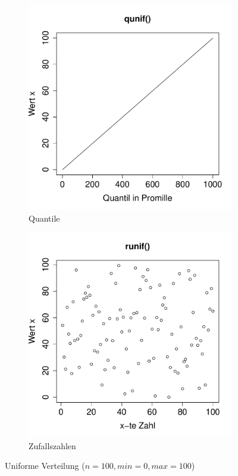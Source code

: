 \begin{figure}[h!]
\begin{subfigure}[b]{0.48\textwidth}
\includegraphics{verteilungen-045}
\caption{Quantile}
\end{subfigure}
\begin{subfigure}[b]{0.48\textwidth}
\includegraphics{verteilungen-046}
\caption{Zufallszahlen}
\end{subfigure}
\caption{Uniforme Verteilung ($n=100, min=0, max=100$)}
\label{fig:unif}
\end{figure}

